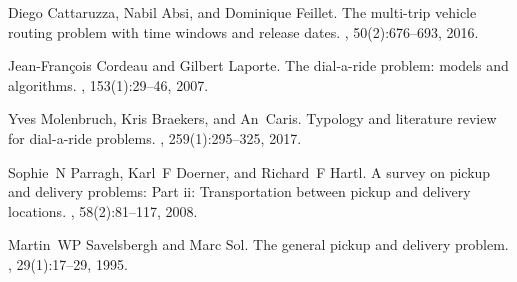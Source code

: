 \documentclass[12pt, a4paper]{article}
\begin{document}
% 
% 

\begin{thebibliography}{1}

Diego Cattaruzza, Nabil Absi, and Dominique Feillet.
\newblock The multi-trip vehicle routing problem with time windows and release
  dates.
, 50(2):676--693, 2016.

Jean-Fran{\c{c}}ois Cordeau and Gilbert Laporte.
\newblock The dial-a-ride problem: models and algorithms.
, 153(1):29--46, 2007.

Yves Molenbruch, Kris Braekers, and An~Caris.
\newblock Typology and literature review for dial-a-ride problems.
, 259(1):295--325, 2017.

Sophie~N Parragh, Karl~F Doerner, and Richard~F Hartl.
\newblock A survey on pickup and delivery problems: Part ii: Transportation
  between pickup and delivery locations.
, 58(2):81--117, 2008.

Martin~WP Savelsbergh and Marc Sol.
\newblock The general pickup and delivery problem.
, 29(1):17--29, 1995.

\end{thebibliography}
\end{document}
